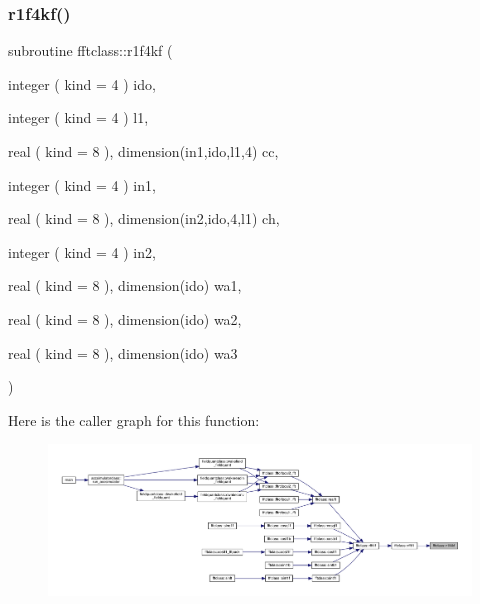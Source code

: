 \subsubsection{\texorpdfstring{r1f4kf()}{r1f4kf()}}
{\footnotesize\ttfamily subroutine fftclass\+::r1f4kf (\begin{DoxyParamCaption}\item[{integer ( kind = 4 )}]{ido,  }\item[{integer ( kind = 4 )}]{l1,  }\item[{real ( kind = 8 ), dimension(in1,ido,l1,4)}]{cc,  }\item[{integer ( kind = 4 )}]{in1,  }\item[{real ( kind = 8 ), dimension(in2,ido,4,l1)}]{ch,  }\item[{integer ( kind = 4 )}]{in2,  }\item[{real ( kind = 8 ), dimension(ido)}]{wa1,  }\item[{real ( kind = 8 ), dimension(ido)}]{wa2,  }\item[{real ( kind = 8 ), dimension(ido)}]{wa3 }\end{DoxyParamCaption})}

Here is the caller graph for this function\+:\nopagebreak
\begin{figure}[H]
\begin{center}
\leavevmode
\includegraphics[width=350pt]{namespacefftclass_ac2e28efef69b7ac5c599c51dc9be973d_icgraph}
\end{center}
\end{figure}
\mbox{\label{namespacefftclass_a42f5de07f4eb994cbe15a8526291566b}} 
